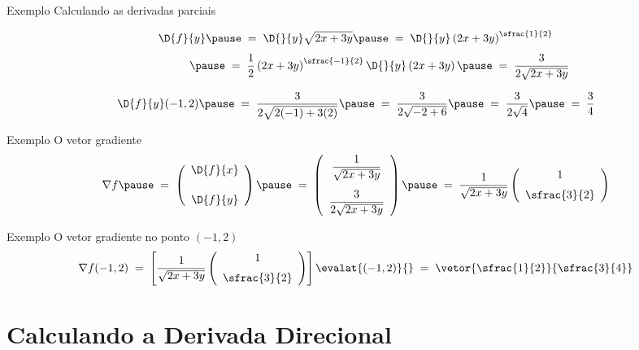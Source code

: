 \begin{frame}{Exemplo \theexemplo}
  Calculando as derivadas parciais

  \pause
  \[
    \D{f}{y}
    \pause
    \;=\; \D{}{y}\sqrt{2x+3y}
    \pause
    \;=\; \D{}{y}\left(2x+3y\right)^{\sfrac{1}{2}}
    \]
    \[
    \hphantom{\D{f}{y}}
    \pause
    \;=\; \frac{1}{2}\left(2x+3y\right)^{\sfrac{-1}{2}}\D{}{y}\left(2x+3y\right)
    \pause
    \;=\; \frac{3}{2\sqrt{2x+3y}}
  \]

  \pause
  \[
    \D{f}{y}(-1, 2)
    \pause
    \;=\; \frac{3}{2\sqrt{2(-1)+3(2)}}
    \pause
    \;=\; \frac{3}{2\sqrt{-2+6}}
    \pause
    \;=\; \frac{3}{2\sqrt{4}}
    \pause
    \;=\; \frac{3}{4}
  \]
\end{frame}

\begin{frame}{Exemplo \theexemplo}
  O vetor gradiente
  \[
    \nabla f
    \pause
    \;=\; \left(\begin{array}{c} \D{f}{x} \\[5mm] \D{f}{y} \end{array}\right)
    \pause
    \;=\; \left(\begin{array}{c}
             \dfrac{1}{\sqrt{2x+3y}} \\[5mm]
             \dfrac{3}{2\sqrt{2x+3y}}
          \end{array}\right)
    \pause
    \;=\; \frac{1}{\sqrt{2x+3y}} \left(\begin{array}{c}
            1 \\[2mm]
            \sfrac{3}{2}
          \end{array}\right)
  \]
\end{frame}

\begin{frame}{Exemplo \theexemplo}
  O vetor gradiente no ponto \((-1, 2)\)
  \[
    \nabla f(-1, 2)
    \;=\; \left[\frac{1}{\sqrt{2x+3y}} \left(\begin{array}{c}
      1 \\[2mm]
      \sfrac{3}{2}
    \end{array}\right)\right]\evalat{(-1, 2)}{}
    \;=\; \vetor{\sfrac{1}{2}}{\sfrac{3}{4}}
  \]
\end{frame}

\section{Calculando a Derivada Direcional}

